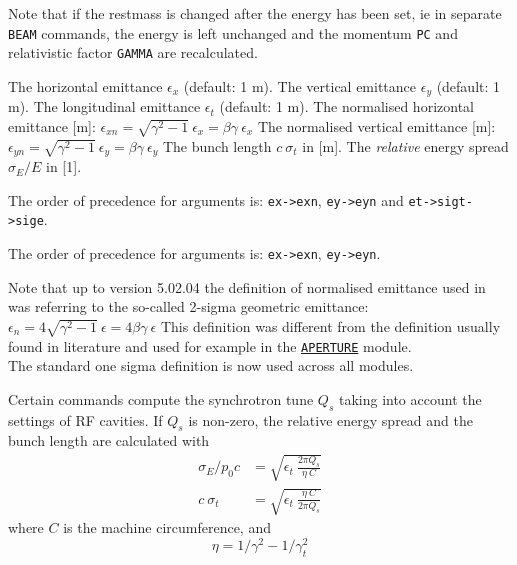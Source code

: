 Note that if the restmass is changed after the energy has been set, ie
in separate {\tt BEAM} commands, the energy is left unchanged and the momentum
{\tt PC} and relativistic factor {\tt GAMMA} are recalculated. 
\\

\begin{madlist}
	 The horizontal emittance $\epsilon_x$ (default: 1 m). 
	 The vertical emittance $\epsilon_y$ (default: 1 m). 
	 The longitudinal emittance $\epsilon_t$ (default: 1 m). 
	 The normalised horizontal emittance [m]:
	$\epsilon_{xn} = \sqrt{\gamma^2 - 1} \ \epsilon_x =  \beta \gamma\ \epsilon_x$
	 The normalised vertical emittance [m]:
	$\epsilon_{yn} = \sqrt{\gamma^2 - 1} \ \epsilon_y = \beta \gamma\ \epsilon_y$
	 The bunch length $c\ \sigma_t$ in [m].  
	 The \emph{relative} energy spread
	$\sigma_E / E$ in [1].  
\end{madlist} 

\begin{5.02.06}
The order of precedence for arguments is: {\tt ex->exn}, {\tt ey->eyn} and 
{\tt et->sigt->sige}.
\end{5.02.06}
\begin{5.03.00}
The order of precedence for arguments is: {\tt ex->exn}, {\tt ey->eyn}.
\end{5.03.00}


Note that up to version 5.02.04 the definition of normalised emittance used in 
\madx was referring to the so-called 2-sigma geometric emittance:
$\epsilon_{n} = 4 \sqrt{\gamma^2 - 1} \ \epsilon = 4 \beta \gamma\ \epsilon$ 
This definition was different from the definition usually found in literature 
and used for example in the \hyperref[chap:aperture]{\tt APERTURE} module.\\
The standard one sigma definition is now used across all \madx modules. 

Certain commands compute the synchrotron tune $Q_s$ taking into account
the settings of RF cavities. 
If $Q_s$ is non-zero, the relative energy spread and 
the bunch length are calculated with
\begin{align}
    \sigma_E / p_0 c  &=  \sqrt{\epsilon_t\ \frac{2 \pi Q_s}{\eta\ C}} \\
          c\ \sigma_t &= \sqrt{\epsilon_t\ \frac{\eta\ C}{2 \pi Q_s}}
\end{align}
where $C$ is the machine circumference, and 
\begin{equation}
  \eta = 1/\gamma^2 - 1/\gamma_t^2  
\end{equation}

